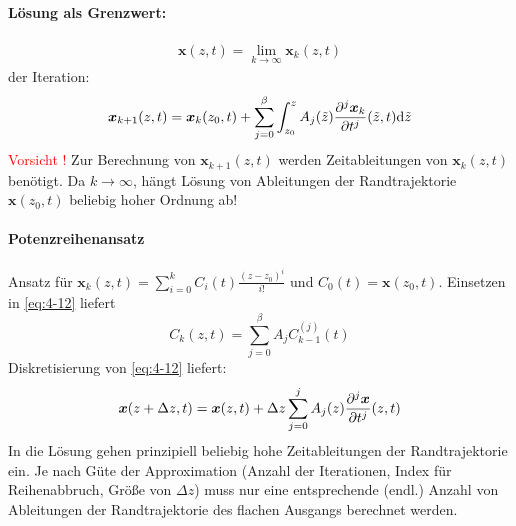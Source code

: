 \paragraph{Lösung als Grenzwert:} 
\begin{align*}
\bm{x}(z,t) = \lim_{k \rightarrow \infty}{\bm{x}_k(z,t)}
\end{align*}
der Iteration:
\begin{align*}
\bm{x}_{k+1}(z,t)=\bm{x}_k(z_0,t)+\sum_{j=0}^\beta \int_{z_0}^z A_j(\tilde{z})\pd[j]{\bm{x}_k}{t^j}(\tilde{z},t)\d \tilde{z}
\end{align*}
\textcolor{red}{Vorsicht !} Zur Berechnung von $\bm{x}_{k+1}(z,t)$ werden Zeitableitungen von $\bm{x}_{k}(z,t)$ benötigt. Da $k \rightarrow \infty$, hängt Lösung von Ableitungen der Randtrajektorie $\bm{x}(z_0,t)$ beliebig hoher Ordnung ab!
\paragraph{Potenzreihenansatz}
Ansatz für $\bm{x}_{k}(z,t)=\sum_{i=0}^kC_i(t)\frac{(z-z_0)^i}{i!}$ und $C_0(t)=\bm{x}(z_0,t)$. Einsetzen in \eqref{eq:4-12} liefert \[ C_k(z,t) = \sum_{j=0}^\beta A_j C_{k-1}^{(j)}(t) \]
Diskretisierung von \eqref{eq:4-12} liefert:
\begin{align*}
\bm{x}(z+\Delta z,t)=\bm{x}(z,t)+\Delta z \sum_{j=0}^{j} A_j(z)\pd[j]{\bm{x}}{t^j}(z,t)
\end{align*}
In die Lösung gehen prinzipiell beliebig hohe Zeitableitungen der Randtrajektorie ein. Je nach Güte der Approximation (Anzahl der Iterationen, Index für Reihenabbruch, Größe von $\Delta z$) muss nur eine entsprechende (endl.) Anzahl von Ableitungen der Randtrajektorie des flachen Ausgangs berechnet werden.
